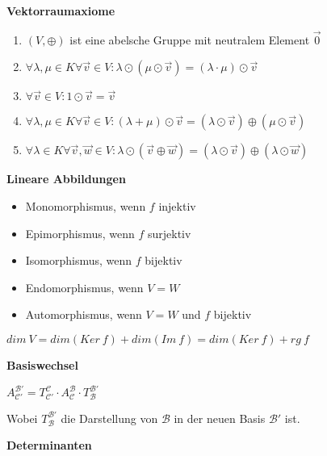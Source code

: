 \documentclass[10pt,fleqn, a4paper]{article}
\begin{document}
\vspace{1cm}

{\bf Vektorraumaxiome}

\begin{enumerate}
\item $(V,\oplus)$ ist eine abelsche Gruppe	mit neutralem Element $\vec 0$
\item $\forall\lambda,\mu\in K\forall\vec v\in V:\lambda\odot(\mu\odot\vec v)=(\lambda\cdot\mu)\odot\vec v$
\item $\forall\vec v\in V:1\odot\vec v=\vec v$
\item $\forall\lambda,\mu\in K\forall\vec v\in V:(\lambda+\mu)\odot\vec v=(\lambda\odot\vec v)\oplus(\mu\odot\vec v)$
\item $\forall\lambda\in K\forall\vec v,\vec w\in V:\lambda\odot(\vec v\oplus\vec w)=(\lambda\odot\vec v)\oplus(\lambda\odot\vec w)$
\end{enumerate}

\vspace{1cm}

{\bf Lineare Abbildungen}

\begin{itemize}
\item Monomorphismus, wenn $f$ injektiv
\item Epimorphismus, wenn $f$ surjektiv
\item Isomorphismus, wenn $f$ bijektiv
\item Endomorphismus, wenn $V=W$
\item Automorphismus, wenn $V=W$ und $f$ bijektiv
\end{itemize}

\begin{center}
$dim\ V=dim(Ker\ f)+dim(Im\ f)=dim(Ker\ f)+rg\ f$
\end{center}

\vspace{1cm}

{\bf Basiswechsel}

\begin{center}
$A^{\mathcal B'}_{\mathcal C'}=T^{\mathcal C}_{\mathcal C'}\cdot A^{\mathcal B}_{\mathcal C}\cdot T^{\mathcal B'}_{\mathcal B}$
\end{center}

Wobei $T^{\mathcal B'}_{\mathcal B}$ die Darstellung von $\mathcal B$ in der neuen Basis $\mathcal B'$ ist.

\vspace{1cm}

{\bf Determinanten}
\end{document}
